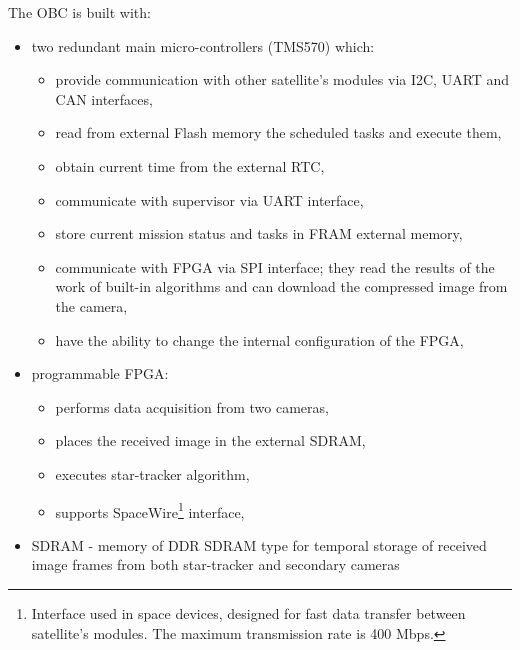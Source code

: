 \documentclass[12pt,a4paper,oneside]{article}
\begin{document}
The OBC is built with:
\begin{itemize}
\item two redundant main micro-controllers (TMS570) which:
\begin{itemize}
\item provide communication with other satellite's modules via I2C, UART and CAN interfaces,
\item read from external Flash memory the scheduled tasks and execute them,
\item obtain current time from the external RTC,
\item communicate with supervisor via UART interface,
\item store current mission status and tasks in FRAM external memory,
\item communicate with FPGA via SPI interface; they read the results of the work of built-in algorithms and can download the compressed image from the camera,
\item have the ability to change the internal configuration of the FPGA,
\end{itemize}

\item programmable FPGA:
\begin{itemize}
\item performs data acquisition from two cameras,
\item places the received image in the external SDRAM,
\item executes star-tracker algorithm,
\item supports SpaceWire\footnote{Interface used in space devices, designed for fast data transfer between satellite's modules. The maximum transmission rate is 400 Mbps.} interface,
\end{itemize}

\item SDRAM - memory of DDR SDRAM type for temporal storage of received image frames from both star-tracker and secondary cameras


\end{itemize}
\end{document}
